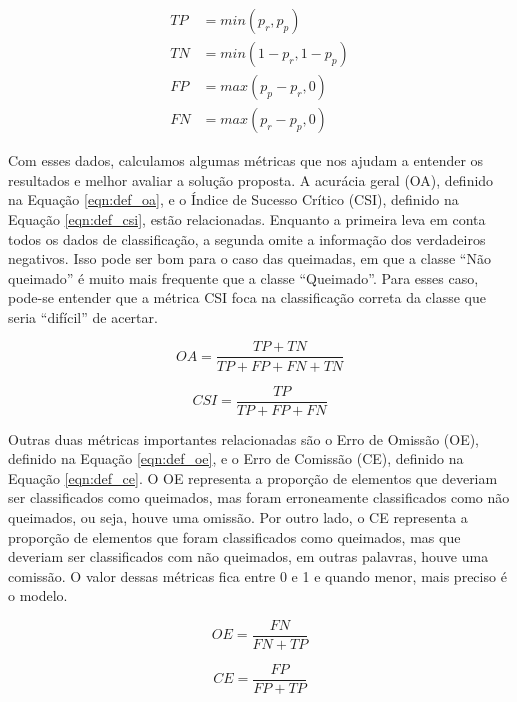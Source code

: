 \documentclass[cic,tc]{iiufrgs}
\begin{document}
\begin{equation} \label{eqn:def_values}
\begin{split}
	TP & = min\left(p_r, p_p\right) \\
	TN & = min\left(1 - p_r, 1 - p_p\right) \\
	FP & = max\left(p_p - p_r, 0\right) \\
	FN & = max\left(p_r - p_p, 0\right)
\end{split}
\end{equation}

Com esses dados, calculamos algumas métricas que nos ajudam a entender os resultados e melhor avaliar a solução proposta. A acurácia geral (OA), definido na Equação \ref{eqn:def_oa}, e o Índice de Sucesso Crítico (CSI), definido na Equação \ref{eqn:def_csi}, estão relacionadas. Enquanto a primeira leva em conta todos os dados de classificação, a segunda omite a informação dos verdadeiros negativos. Isso pode ser bom para o caso das queimadas, em que a classe ``Não queimado'' é muito mais frequente que a classe ``Queimado''. Para esses caso, pode-se entender que a métrica CSI foca na classificação correta da classe que seria ``difícil'' de acertar.

\begin{equation} \label{eqn:def_oa}
  OA = \frac{TP + TN}{TP + FP + FN + TN}
\end{equation}

\begin{equation} \label{eqn:def_csi}
  CSI = \frac{TP}{TP + FP + FN}
\end{equation}

Outras duas métricas importantes relacionadas são o Erro de Omissão (OE), definido na Equação \ref{eqn:def_oe}, e o Erro de Comissão (CE), definido na Equação \ref{eqn:def_ce}. O OE representa a proporção de elementos que deveriam ser classificados como queimados, mas foram erroneamente classificados como não queimados, ou seja, houve uma omissão. Por outro lado, o CE representa a proporção de elementos que foram classificados como queimados, mas que deveriam ser classificados com não queimados, em outras palavras, houve uma comissão. O valor dessas métricas fica entre 0 e 1 e quando menor, mais preciso é o modelo.

\begin{equation} \label{eqn:def_oe}
  OE = \frac{FN}{FN + TP}
\end{equation}

\begin{equation} \label{eqn:def_ce}
  CE = \frac{FP}{FP + TP}
\end{equation}
\end{document}
